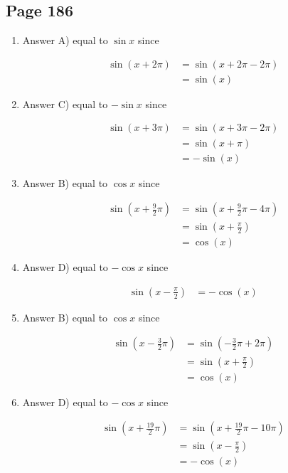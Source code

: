 \documentclass{article}
\newenvironment{solutions}[1]
{\subsection*{#1}
 \begin{enumerate}[leftmargin=1.5em]}
{\end{enumerate}}
\newcommand{\solution}{\item}
\begin{document}
\begin{solutions}{Page 186}
\solution
Answer A) equal to $\sin x$ since

\begin{align*}
    \sin (x+2\pi) &= \sin (x+2\pi - 2\pi)\\
                  &= \sin (x)
\end{align*}

\solution

Answer C) equal to $-\sin x$ since

\begin{align*}
    \sin (x+3\pi) &= \sin (x+3\pi - 2\pi)\\
                  &= \sin (x+\pi)\\
                  &= -\sin(x)
\end{align*}

\solution
Answer B) equal to $\cos x$ since

\begin{align*}
    \sin \left(x+\frac{9}{2}\pi\right) &= \sin \left(x+\frac{9}{2}\pi - 4\pi\right)\\
                       &= \sin \left(x+\frac{\pi}{2}\right)\\
                      &= \cos(x)
\end{align*}

\solution
Answer D) equal to $-\cos x$ since

\begin{align*}
    \sin \left(x-\frac{\pi}{2}\right) &= -\cos(x) 
\end{align*}

\solution
Answer B) equal to $\cos x$ since

\begin{align*}
    \sin \left(x-\frac{3}{2}\pi\right) &= \sin \left(-\frac{3}{2}\pi + 2\pi\right)\\
                       &= \sin \left(x+\frac{\pi}{2}\right)\\
                      &= \cos(x)
\end{align*}

\solution
Answer D) equal to $-\cos x$ since

\begin{align*}
    \sin \left(x+\frac{19}{2}\pi\right) &= \sin \left(x+\frac{19}{2}\pi - 10\pi\right)\\
                       &= \sin \left(x-\frac{\pi}{2}\right)\\
                      &= -\cos(x)
\end{align*}


\end{solutions}
\end{document}
